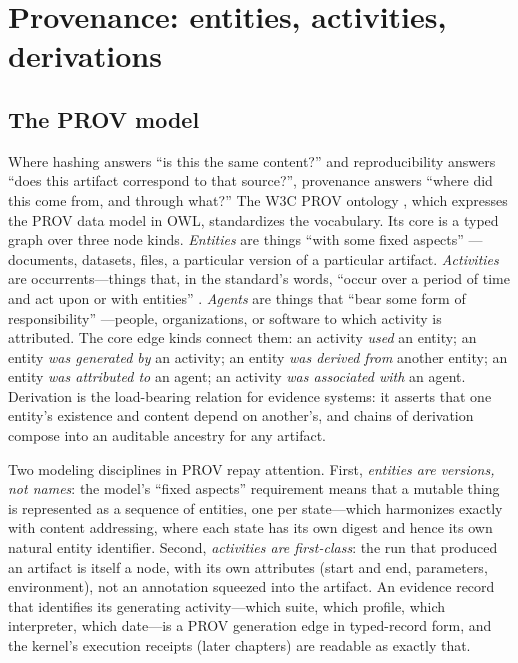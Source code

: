 \section{Provenance: entities, activities, derivations}\label{ch02:prov}

\subsection{The PROV model}\label{ch02:prov-model}

Where hashing answers ``is this the same content?'' and
reproducibility answers ``does this artifact correspond to that
source?'', provenance answers ``where did this come from, and
through what?'' The W3C PROV ontology \cite{prov}, which expresses
the PROV data model in OWL, standardizes the
vocabulary. Its core is a typed graph over three node kinds.
\emph{Entities} are things ``with some fixed aspects'' \cite{prov}---documents, datasets,
files, a particular version of a particular artifact.
\emph{Activities} are occurrents---things that, in the standard's
words, ``occur over a period of time and act upon or with
entities'' \cite{prov}. \emph{Agents} are things that ``bear some form
of responsibility'' \cite{prov}---people, organizations, or software to which activity is
attributed. The core edge kinds connect them: an activity
\emph{used} an entity; an entity \emph{was generated by} an
activity; an entity \emph{was derived from} another entity; an
entity \emph{was attributed to} an agent; an activity \emph{was
associated with} an agent. Derivation is the load-bearing relation
for evidence systems: it asserts that one entity's existence and
content depend on another's, and chains of derivation compose into
an auditable ancestry for any artifact.

Two modeling disciplines in PROV repay attention. First,
\emph{entities are versions, not names}: the model's ``fixed
aspects'' requirement means that a mutable thing is represented as a
sequence of entities, one per state---which harmonizes exactly with
content addressing, where each state has its own digest and hence
its own natural entity identifier. Second, \emph{activities are
first-class}: the run that produced an artifact is itself a node,
with its own attributes (start and end, parameters, environment),
not an annotation squeezed into the artifact. An evidence record
that identifies its generating activity---which suite, which
profile, which interpreter, which date---is a PROV generation edge
in typed-record form, and the kernel's execution receipts (later
chapters) are readable as exactly that.

